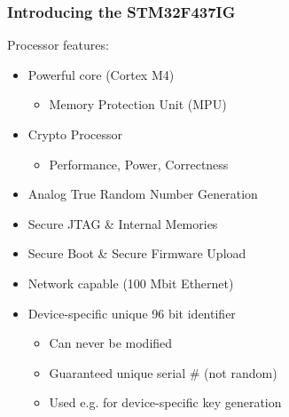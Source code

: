 \subsubsection{Introducing the STM32F437IG}
Processor features:
\begin{itemize}
  \item Powerful core (Cortex M4)
        \begin{itemize}
          \item Memory Protection Unit (MPU)
        \end{itemize}
  \item Crypto Processor
        \begin{itemize}
          \item Performance, Power, Correctness
        \end{itemize}
  \item Analog True Random Number Generation
  \item Secure JTAG \& Internal Memories
  \item Secure Boot \& Secure Firmware Upload
  \item Network capable (100 Mbit Ethernet)
  \item Device-specific unique 96 bit identifier
        \begin{itemize}
          \item Can never be modified
          \item Guaranteed unique serial \# (not random)
          \item Used e.g. for device-specific key generation
        \end{itemize}
\end{itemize}

